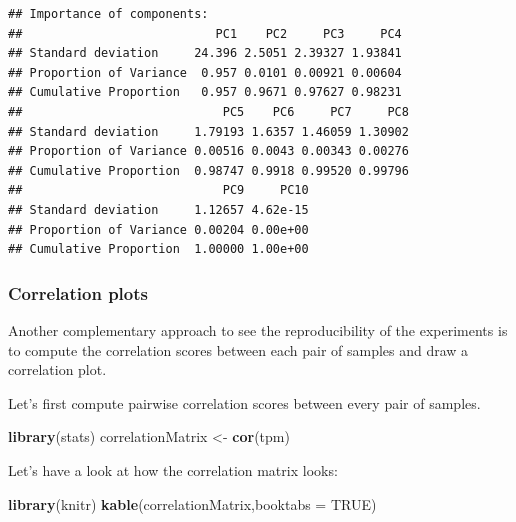 \documentclass[12pt,]{krantz}
\newenvironment{Shaded}{\begin{snugshade}}{\end{snugshade}}
\newcommand{\DataTypeTok}[1]{\textcolor[rgb]{0.13,0.29,0.53}{#1}}
\newcommand{\KeywordTok}[1]{\textcolor[rgb]{0.13,0.29,0.53}{\textbf{#1}}}
\newcommand{\NormalTok}[1]{#1}
\newcommand{\OtherTok}[1]{\textcolor[rgb]{0.56,0.35,0.01}{#1}}
\newcommand{\StringTok}[1]{\textcolor[rgb]{0.31,0.60,0.02}{#1}}
\begin{document}
\begin{verbatim}
## Importance of components:
##                           PC1    PC2     PC3     PC4
## Standard deviation     24.396 2.5051 2.39327 1.93841
## Proportion of Variance  0.957 0.0101 0.00921 0.00604
## Cumulative Proportion   0.957 0.9671 0.97627 0.98231
##                            PC5    PC6     PC7     PC8
## Standard deviation     1.79193 1.6357 1.46059 1.30902
## Proportion of Variance 0.00516 0.0043 0.00343 0.00276
## Cumulative Proportion  0.98747 0.9918 0.99520 0.99796
##                            PC9     PC10
## Standard deviation     1.12657 4.62e-15
## Proportion of Variance 0.00204 0.00e+00
## Cumulative Proportion  1.00000 1.00e+00
\end{verbatim}

\hypertarget{correlation-plots}{%
\subsubsection{Correlation plots}\label{correlation-plots}}

Another complementary approach to see the reproducibility of the experiments is to compute the correlation scores between each pair of samples and draw a correlation plot.

Let's first compute pairwise correlation scores between every pair of samples.

\begin{Shaded}
\begin{Highlighting}[]
\KeywordTok{library}\NormalTok{(stats)}
\NormalTok{correlationMatrix <-}\StringTok{ }\KeywordTok{cor}\NormalTok{(tpm)}
\end{Highlighting}
\end{Shaded}

Let's have a look at how the correlation matrix looks:

\begin{Shaded}
\begin{Highlighting}[]
\KeywordTok{library}\NormalTok{(knitr)}
\KeywordTok{kable}\NormalTok{(correlationMatrix,}\DataTypeTok{booktabs =} \OtherTok{TRUE}\NormalTok{)}
\end{Highlighting}
\end{Shaded}
\end{document}
